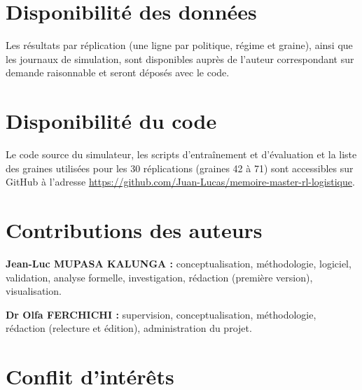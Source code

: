 \documentclass[11pt,a4paper]{article}
\newif\ifrevmarks
\newcommand{\revtag}[1]{\ifrevmarks\textsuperscript{\textcolor{red!70!black}{\scriptsize[#1]}}\fi}
\newcommand{\rev}[2]{\ifrevmarks{\color{revcolor}#2}\revtag{#1}\else#2\fi}
\newcommand{\adir}[1]{\ifrevmarks\textcolor{violet}{\textbf{[À VALIDER AVEC LA DIRECTRICE : #1]}}\fi}
\begin{document}
\newpage

\section*{Disponibilité des données}

\rev{M3}{Les résultats par réplication (une ligne par politique, régime et graine), ainsi que les journaux de simulation, sont disponibles auprès de l'auteur correspondant sur demande raisonnable et seront déposés avec le code.}

\section*{Disponibilité du code}

Le code source du simulateur, les scripts d'entraînement et d'évaluation et la liste des graines utilisées pour les 30 réplications (graines 42 à 71) sont accessibles sur GitHub à l'adresse \url{https://github.com/Juan-Lucas/memoire-master-rl-logistique}.

\adir{la version précédente mentionnait des fichiers YAML d'hyperparamètres dans un répertoire \texttt{configs/}. Ce répertoire existe, mais aucun script ne lit ses fichiers : les valeurs sont recopiées en dur dans le code et \texttt{experiment\_config.yaml} indique une version de Python erronée. Faire lire ces fichiers par les scripts, ou retirer la mention (plan de correction, T28). Les références internes au mémoire ont été retirées des commentaires du code le 7 octobre 2026 (rapport d'audit, N10).}

\section*{Contributions des auteurs}

\textbf{Jean-Luc MUPASA KALUNGA :} conceptualisation, méthodologie, logiciel, validation, analyse formelle, investigation, rédaction (première version), visualisation.

\textbf{Dr Olfa FERCHICHI :} supervision, conceptualisation, méthodologie, rédaction (relecture et édition), administration du projet.

\section*{Conflit d'intérêts}
\end{document}
